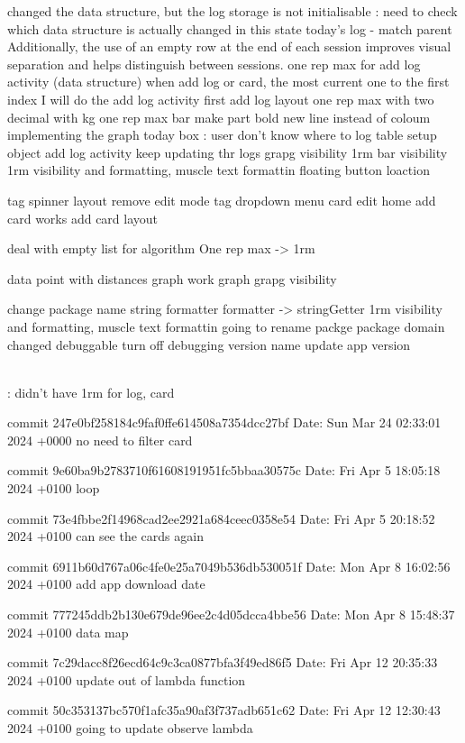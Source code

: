 changed the data structure, but the log storage is not initialisable 
\todo : need to check which data structure is actually changed in this state
today's log - match parent
Additionally, the use of an empty row at the end of each session improves visual separation and helps distinguish between sessions.
one rep max for add log activity (data structure)
when add log or card, the most current one to the first index
I will do the add log activity first
add log layout
one rep max with two decimal with kg
one rep max bar
make part bold
new line instead of coloum
implementing the graph
today box : user don't know where to log
table setup object
add log activity keep updating thr logs
grapg visibility
1rm bar visibility
1rm visibility and formatting, muscle text formattin
floating button loaction


tag spinner layout
remove edit mode
tag dropdown menu
card edit
home add card works
add card layout


deal with empty list for algorithm
One rep max -> 1rm


data point with distances
graph work
graph
grapg visibility


change package name
string formatter
formatter -> stringGetter
1rm visibility and formatting, muscle text formattin
going to rename packge
package domain changed
debuggable
turn off debugging
version name update
app version


\\ : 
didn't have 1rm for log, card


commit 247e0bf258184c9faf0ffe614508a7354dcc27bf
Date:   Sun Mar 24 02:33:01 2024 +0000
    no need to filter card

commit 9e60ba9b2783710f61608191951fc5bbaa30575c
Date:   Fri Apr 5 18:05:18 2024 +0100
    loop

commit 73e4fbbe2f14968cad2ee2921a684ceec0358e54
Date:   Fri Apr 5 20:18:52 2024 +0100
    can see the cards again

commit 6911b60d767a06c4fe0e25a7049b536db530051f
Date:   Mon Apr 8 16:02:56 2024 +0100
    add app download date

commit 777245ddb2b130e679de96ee2c4d05dcca4bbe56
Date:   Mon Apr 8 15:48:37 2024 +0100
    data map

commit 7c29dacc8f26ecd64c9c3ca0877bfa3f49ed86f5
Date:   Fri Apr 12 20:35:33 2024 +0100
    update out of lambda function

commit 50c353137bc570f1afc35a90af3f737adb651c62
Date:   Fri Apr 12 12:30:43 2024 +0100
    going to update observe lambda



